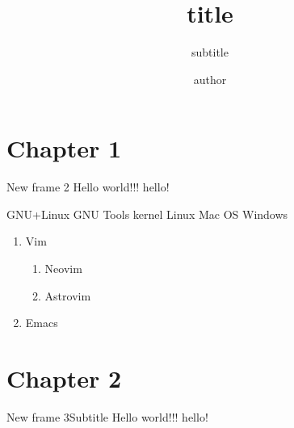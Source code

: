 \documentclass[dracula,12pt]{darkbeamer}
\author{author}
\title{title}
\subtitle{subtitle}
\institute{My University}
\begin{document}
\section{Chapter 1}
\begin{frame}{}
	\titlepage
\end{frame}

\begin{frame}{New frame 2}
	Hello world!!! \alert{hello!}
	\begin{outline}
		\1 GNU+Linux
			\2 GNU Tools
			\2 kernel Linux
		\1 Mac OS
		\1 Windows
	\end{outline}
	\begin{enumerate}
		\item Vim
		\begin{enumerate}
				\item Neovim
				\item Astrovim
		\end{enumerate}
		\item Emacs
	\end{enumerate}

\end{frame}

\section{Chapter 2}
\begin{frame}{New frame 3}{Subtitle}
	Hello world!!! \alert{hello!}
\end{frame}
\end{document}
